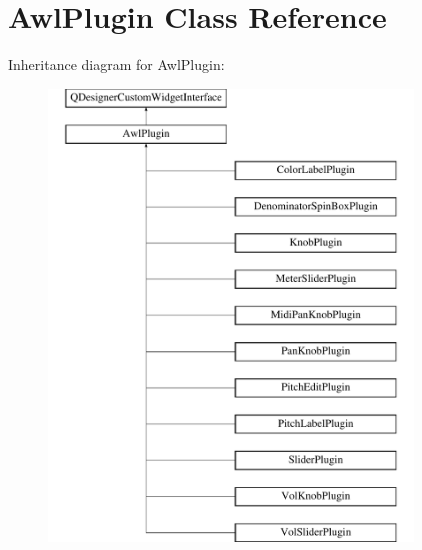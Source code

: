 \hypertarget{class_awl_plugin}{}\section{Awl\+Plugin Class Reference}
\label{class_awl_plugin}
Inheritance diagram for Awl\+Plugin\+:\begin{figure}[H]
\begin{center}
\leavevmode
\includegraphics[height=12.000000cm]{class_awl_plugin}
\end{center}
\end{figure}
